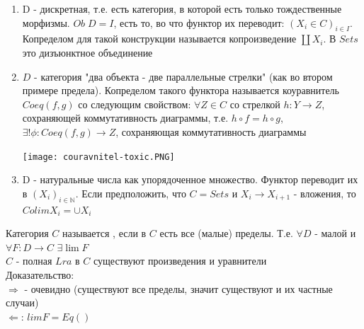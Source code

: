 \documentclass[a4paper]{article}
\theoremstyle{indented}
\theoremstyle{definition}
\theoremstyle{remark}
\DeclareMathOperator{\ra}{\rightarrow}
\DeclareMathOperator{\La}{\Leftarrow}
\DeclareMathOperator{\Ra}{\Rightarrow}
\begin{document}
\begin{enumerate}
    \item D - дискретная, т.е. есть категория, в которой есть только тождественные морфизмы. $Ob\;D = I$, есть то, во что функтор их переводит: $(X_i \in C)_{i\in I}$. Копределом для такой конструкции называется копроизведение $\coprod X_i$. В $Sets$ это дизъюнктное объединение
    \item $D$ - категория "два объекта - две параллельные стрелки" (как во втором примере предела). Копределом такого функтора называется коуравнитель $Coeq(f, g)$ со следующим свойством: $\forall Z \in C$ со стрелкой $h: Y \ra Z$, сохраняющей коммутативность диаграммы, т.е. $h \circ f = h \circ g$, $\exists ! \phi: Coeq(f, g) \ra Z$, сохраняющая коммутативность диаграммы
    \begin{center}\texttt{[image: couravnitel-toxic.PNG]}\end{center}
    \item D - натуральные числа как упорядоченное множество. Функтор переводит их в $(X_i)_{i \in \mathbb{N}}$. Если предположить, что $C = Sets$ и $X_i \ra X_{i+1}$ - вложения, то $Colim X_i = \cup X_i$
\end{enumerate}
 Категория $C$ называется , если в $C$ есть все (малые) пределы. Т.е. $\forall D$ - малой и $\forall F: D \ra C$ $\exists \lim F$ \\


\theorem $C$ - полная $Lra$ в $C$ существуют произведения и уравнители \\

Доказательство: \\
$\Ra$ - очевидно (существуют все пределы, значит существуют и их частные случаи) \\
$\La$: $lim F = Eq()$

\normalfont
\end{document}
